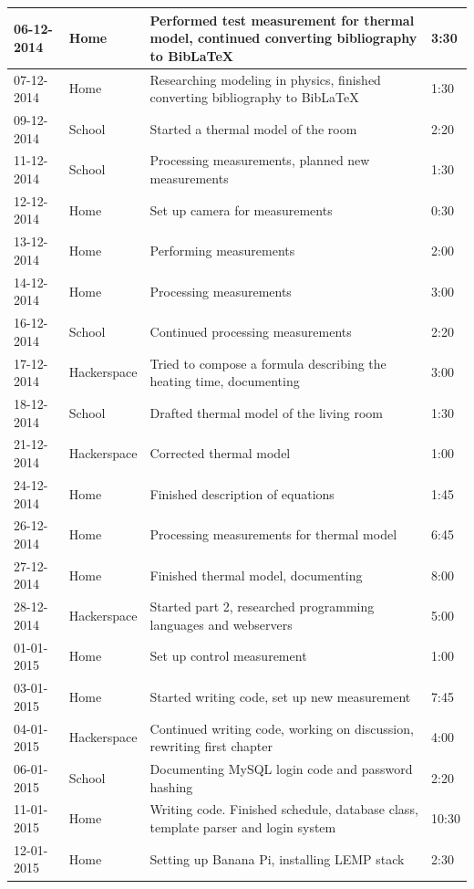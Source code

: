 \documentclass[12pt,a4paper,final]{report}
\begin{document}
\begin{longtable}{ | p{2.5cm} | p{2.5cm} | p{5cm} | p{2cm} |}
	\hline
	06-12-2014 & Home & Performed test measurement for thermal model, continued converting bibliography to Bib\LaTeX{} & 3:30 \\
	\hline
	07-12-2014 & Home & Researching modeling in physics, finished converting bibliography to Bib\LaTeX{} & 1:30 \\
	\hline
	09-12-2014 & School & Started a thermal model of the room & 2:20 \\
	\hline
	11-12-2014 & School & Processing measurements, planned new measurements & 1:30 \\
	\hline
	12-12-2014 & Home & Set up camera for measurements & 0:30 \\
	\hline
	13-12-2014 & Home & Performing measurements & 2:00 \\
	\hline
	14-12-2014 & Home & Processing measurements & 3:00  \\
	\hline
	16-12-2014 & School & Continued processing measurements & 2:20 \\
	\hline
	17-12-2014 & Hackerspace & Tried to compose a formula describing the heating time, documenting & 3:00 \\
	\hline
	18-12-2014 & School & Drafted thermal model of the living room & 1:30 \\
	\hline
	21-12-2014 & Hackerspace & Corrected thermal model & 1:00 \\
	\hline
	24-12-2014 & Home & Finished description of equations & 1:45 \\
	\hline
	26-12-2014 & Home & Processing measurements for thermal model & 6:45 \\
	\hline
	27-12-2014 & Home & Finished thermal model, documenting & 8:00 \\
	\hline
	28-12-2014 & Hackerspace & Started part 2, researched programming languages and webservers & 5:00 \\
	\hline
	01-01-2015 & Home & Set up control measurement & 1:00 \\
	\hline
	03-01-2015 & Home & Started writing code, set up new measurement & 7:45 \\
	\hline
	04-01-2015 & Hackerspace & Continued writing code, working on discussion, rewriting first chapter & 4:00 \\
	\hline
	06-01-2015 & School & Documenting MySQL login code and password hashing & 2:20 \\
	\hline
	11-01-2015 & Home & Writing code. Finished schedule, database class, template parser and login system & 10:30 \\
	\hline
	12-01-2015 & Home & Setting up Banana Pi, installing LEMP stack & 2:30 \\

\end{longtable}
\end{document}
